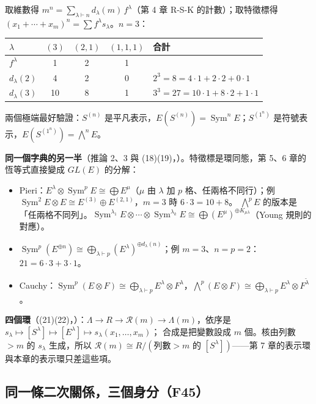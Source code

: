 取維數得 $m^n=\sum_{\lambda\vdash n}d_\lambda(m)\,f^\lambda$（第 4 章 R-S-K 的計數）；取特徵標得 $(x_1+\cdots+x_m)^n=\sum f^\lambda s_\lambda$。$n=3$：
\begin{center}
\begin{tabular}{@{}lccc@{\qquad}l@{}}
\toprule
$\lambda$ & $(3)$ & $(2,1)$ & $(1,1,1)$ & 合計\\
\midrule
$f^\lambda$ & 1 & 2 & 1 & \\
$d_\lambda(2)$ & 4 & 2 & 0 & $2^3=8=4\cdot1+2\cdot2+0\cdot1$\\
$d_\lambda(3)$ & 10 & 8 & 1 & $3^3=27=10\cdot1+8\cdot2+1\cdot1$\\
\bottomrule
\end{tabular}
\end{center}
兩個極端最好驗證：$S^{(n)}$ 是平凡表示，$E(S^{(n)})=\operatorname{Sym}^nE$；$S^{(1^n)}$ 是符號表示，$E(S^{(1^n)})=\bigwedge^nE$。

\textbf{同一個字典的另一半}（推論 2、3 與 (18)(19)，）。特徵標是環同態，第 5、6 章的恆等式直接變成 $GL(E)$ 的分解：
\begin{itemize}
\item Pieri：$E^\lambda\otimes\operatorname{Sym}^pE\cong\bigoplus E^\mu$（$\mu$ 由 $\lambda$ 加 $p$ 格、任兩格不同行）；例 $\operatorname{Sym}^2E\otimes E\cong E^{(3)}\oplus E^{(2,1)}$，$m=3$ 時 $6\cdot3=10+8$。
      $\bigwedge^pE$ 的版本是「任兩格不同列」。$\operatorname{Sym}^{\lambda_1}E\otimes\cdots\otimes\operatorname{Sym}^{\lambda_k}E\cong\bigoplus(E^\mu)^{\oplus K_{\mu\lambda}}$（Young 規則的對應）。
\item $\operatorname{Sym}^p(E^{\oplus n})\cong\bigoplus_{\lambda\vdash p}(E^\lambda)^{\oplus d_\lambda(n)}$；例 $m=3$、$n=p=2$：$21=6\cdot3+3\cdot1$。
\item Cauchy：$\operatorname{Sym}^p(E\otimes F)\cong\bigoplus_{\lambda\vdash p}E^\lambda\otimes F^\lambda$，$\bigwedge^p(E\otimes F)\cong\bigoplus_{\lambda\vdash p}E^\lambda\otimes F^{\tilde\lambda}$。
\end{itemize}

\textbf{四個環}（(21)(22)，）：$\Lambda\to R\to\mathcal R(m)\to\Lambda(m)$，依序是 $s_\lambda\mapsto[S^\lambda]\mapsto[E^\lambda]\mapsto s_\lambda(x_1,\ldots,x_m)$；
合成是把變數設成 $m$ 個。核由列數 $>m$ 的 $s_\lambda$ 生成，所以 $\mathcal R(m)\cong R/(\text{列數}>m\text{ 的 }[S^\lambda])$——第 7 章的表示環與本章的表示環只差這些項。

\subsection{同一條二次關係，三個身分（F45）}\label{sec:f-quadratic}

